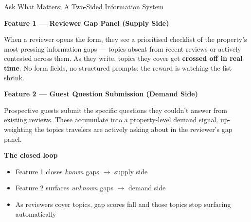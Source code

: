\documentclass[aspectratio=169,10pt]{beamer}
\newcommand{\shead}[1]{\smallskip\textbf{#1}\par\smallskip}
\newcommand{\arrow}{$\rightarrow$}
\begin{document}
\begin{frame}{Ask What Matters: A Two-Sided Information System}

\shead{Feature 1 --- Reviewer Gap Panel (Supply Side)}
When a reviewer opens the form, they see a prioritised checklist of the property's most pressing
information gaps --- topics absent from recent reviews or actively contested across them.
As they write, topics they cover get \textbf{crossed off in real time}.
No form fields, no structured prompts: the reward is watching the list shrink.

\medskip
\shead{Feature 2 --- Guest Question Submission (Demand Side)}
Prospective guests submit the specific questions they couldn't answer from existing reviews.
These accumulate into a property-level demand signal, up-weighting the topics
travelers are actively asking about in the reviewer's gap panel.

\medskip
\shead{The closed loop}
\begin{itemize}
  \item Feature 1 closes \textit{known} gaps \arrow{} supply side
  \item Feature 2 surfaces \textit{unknown} gaps \arrow{} demand side
  \item As reviewers cover topics, gap scores fall and those topics stop surfacing automatically
\end{itemize}

\end{frame}
\end{document}
